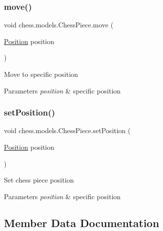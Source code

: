 \subsubsection{\texorpdfstring{move()}{move()}}
{\footnotesize\ttfamily void chess.\+models.\+Chess\+Piece.\+move (\begin{DoxyParamCaption}\item[{\mbox{\hyperlink{classchess_1_1models_1_1_position}{Position}}}]{position }\end{DoxyParamCaption})}

Move to specific position


\begin{DoxyParams}{Parameters}
{\em position} & specific position \\
\hline
\end{DoxyParams}
\mbox{\label{classchess_1_1models_1_1_chess_piece_a2e3c62bde5041ca0aa53e0476cc8b600}} 
\subsubsection{\texorpdfstring{set\+Position()}{setPosition()}}
{\footnotesize\ttfamily void chess.\+models.\+Chess\+Piece.\+set\+Position (\begin{DoxyParamCaption}\item[{\mbox{\hyperlink{classchess_1_1models_1_1_position}{Position}}}]{position }\end{DoxyParamCaption})}

Set chess piece position


\begin{DoxyParams}{Parameters}
{\em position} & specific position \\
\hline
\end{DoxyParams}


\subsection{Member Data Documentation}
\mbox{\label{classchess_1_1models_1_1_chess_piece_a3bcc8a24667318b5aab8c146adcc3eb7}} 
